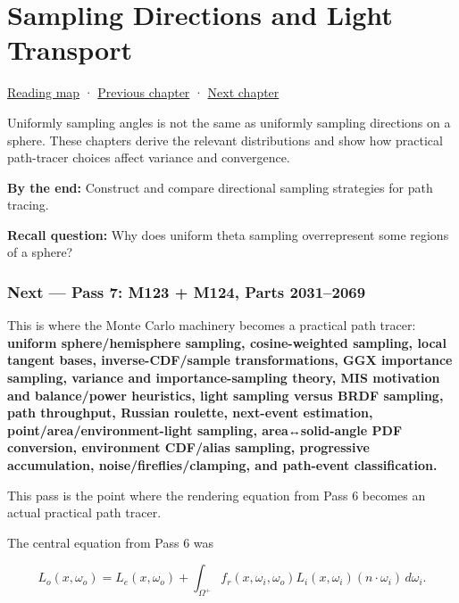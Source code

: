 \hypertarget{03-visual-computing-i-ch008}{}
\chapter{Sampling Directions and Light Transport}\label{stagechapter:03-visual-computing-i-ch008}\label{03-visual-computing-i-ch008-sampling-directions-and-light-transport}

\hyperref[volume-reading-map]{Reading map} · \hyperref[03-visual-computing-i-ch007-the-rendering-equation-and-path-probabilities]{Previous chapter} · \hyperref[03-visual-computing-i-ch009-point-lights-mis-and-environment-lighting]{Next chapter}

Uniformly sampling angles is not the same as uniformly sampling directions on a sphere. These chapters derive the relevant distributions and show how practical path-tracer choices affect variance and convergence.

\textbf{By the end:} Construct and compare directional sampling strategies for path tracing.

\textbf{Recall question:} Why does uniform theta sampling overrepresent some regions of a sphere?

\subsection{Next --- Pass 7: M123 + M124, Parts 2031--2069}\label{03-visual-computing-i-ch008-next-pass-7-m123-m124-parts-20312069}

This is where the Monte Carlo machinery becomes a practical path tracer: \textbf{uniform sphere/hemisphere sampling, cosine-weighted sampling, local tangent bases, inverse-CDF/sample transformations, GGX importance sampling, variance and importance-sampling theory, MIS motivation and balance/power heuristics, light sampling versus BRDF sampling, path throughput, Russian roulette, next-event estimation, point/area/environment-light sampling, area↔solid-angle PDF conversion, environment CDF/alias sampling, progressive accumulation, noise/fireflies/clamping, and path-event classification.}

This pass is the point where the rendering equation from Pass 6 becomes an actual practical path tracer.

The central equation from Pass 6 was

\[
L_o(x,\omega_o)
=
L_e(x,\omega_o)
+
\int_{\Omega^+}
f_r(x,\omega_i,\omega_o)
L_i(x,\omega_i)
\left(n\cdot\omega_i\right)
\,d\omega_i.
\]

